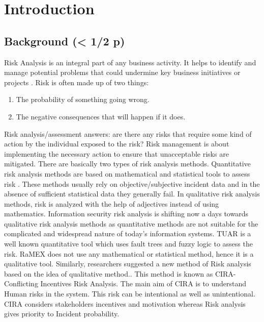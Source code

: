 \documentclass[a4paper,twoside,10pt]{report}
\begin{document}
\chapter{Introduction}\label{intro}

\section{Background (< 1/2 p)}\label{BackG}

Risk Analysis is an integral part of any business activity. It helps to identify and manage potential problems that could undermine key business initiatives or projects \cite{6462696}. Risk is often made up of two things:

\begin{enumerate}
	\item The probability of something going wrong.
	\item The negative consequences that will happen if it does.
\end{enumerate}

Risk analysis/assessment answers: are there any risks that require some kind of action by the individual exposed to the risk? Risk management is about implementing the necessary action to ensure that unacceptable risks are mitigated. There are basically two types of risk analysis methods. Quantitative risk analysis methods are based on mathematical and statistical tools to assess risk \cite{Karabacak2005147}. These methods usually rely on objective/subjective incident data and in the absence of sufficient statistical data they generally fail. In qualitative risk analysis methods, risk is analyzed with the help of adjectives instead of using mathematics. Information security risk analysis is shifting now a days towards qualitative risk analysis methods as quantitative methods are not suitable for the complicated and widespread nature of today's information systems.   TUAR \cite{253757} is a well known quantitative tool which uses fault trees and fuzzy logic to assess the risk. RaMEX \cite{Kailay1995449} does not use any mathematical or statistical method, hence it is a qualitative tool. Similarly, researchers suggested a new method of Risk analysis based on the idea of qualitative method.\cite{lisaB}. This method is known as CIRA- Conflicting Incentives Risk Analysis.  The main aim of CIRA is to understand Human risks in the system. This risk can be intentional as well as unintentional. CIRA considers stakeholders incentives and motivation whereas Risk analysis gives priority to Incident probability. 
\end{document}
